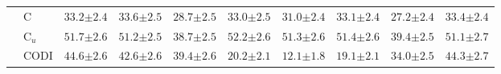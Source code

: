 \begin{table}[!h]
\begin{tabular}{ll c ccc ccc c}
 & C & $33.2 {\scriptstyle \pm 2.4}$ & $33.6 {\scriptstyle \pm 2.5}$ & $28.7 {\scriptstyle \pm 2.5}$ & $33.0 {\scriptstyle \pm 2.5}$ & $31.0 {\scriptstyle \pm 2.4}$ & $33.1 {\scriptstyle \pm 2.4}$ & $27.2 {\scriptstyle \pm 2.4}$ & $33.4 {\scriptstyle \pm 2.4}$ \\
 & C$_u$ & $51.7 {\scriptstyle \pm 2.6}$ & $51.2 {\scriptstyle \pm 2.5}$ & $38.7 {\scriptstyle \pm 2.5}$ & $52.2 {\scriptstyle \pm 2.6}$ & $51.3 {\scriptstyle \pm 2.6}$ & $51.4 {\scriptstyle \pm 2.6}$ & $39.4 {\scriptstyle \pm 2.5}$ & $51.1 {\scriptstyle \pm 2.7}$ \\
 & CODI & $44.6 {\scriptstyle \pm 2.6}$ & $42.6 {\scriptstyle \pm 2.6}$ & $39.4 {\scriptstyle \pm 2.6}$ & $20.2 {\scriptstyle \pm 2.1}$ & $12.1 {\scriptstyle \pm 1.8}$ & $19.1 {\scriptstyle \pm 2.1}$ & $34.0 {\scriptstyle \pm 2.5}$ & $44.3 {\scriptstyle \pm 2.7}$ \\
\bottomrule
\end{tabular}
\end{table}